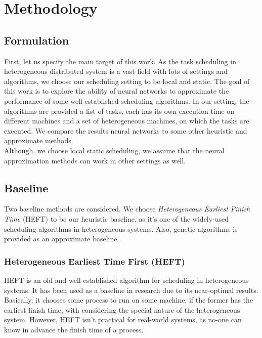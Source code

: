 \documentclass[twocolumn,11pt]{IEEEtran}
\begin{document}
\section{Methodology}

\subsection{Formulation}
First, let us specify the main target of this work. As the task scheduling in heterogeneous distributed system is a vast field with lots of settings and algorithms\cite{inbook}, we choose our scheduling setting to be local and static. The goal of this work is to explore the ability of neural networks to approximate the performance of some well-established scheduling algorithms. In our setting, the algorithms are provided a list of tasks, each has its own execution time on different machines and a set of heterogeneous machines, on which the tasks are executed. We compare the results neural networks to some other heuristic and approximate methods. \\
Although, we choose local static scheduling, we assume that the neural approximation methods can work in other settings as well.

\subsection{Baseline}
Two baseline methods are considered. We choose \emph{Heterogeneous Earliest Finish Time} (HEFT)\cite{993206} to be our heuristic baseline, as it's one of the widely-used scheduling algorithms in heterogeneous systems. Also, genetic algorithms\cite{article2} is provided as an approximate baseline.

\subsubsection{Heterogeneous Earliest Time First (HEFT)}
HEFT\cite{993206} is an old and well-established algorithm for scheduling in heterogeneous systems. It has been used as a baseline in research due to its near-optimal results. Basically, it chooses some process to run on some machine, if the former has the earliest finish time, with considering the special nature of the heterogeneous system. However, HEFT isn't practical for real-world systems, as no-one can know in advance the finish time of a process.
\end{document}
